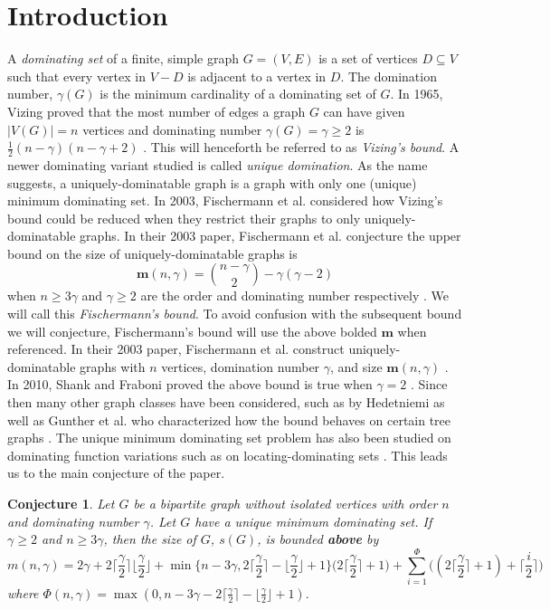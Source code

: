 \documentclass[12pt]{amsart}
\newtheorem{con}[thm]{Conjecture}
\begin{document}
\section{Introduction}
A \textit{dominating set} of a finite, simple graph $G = (V,E)$ is a set of vertices $D \subseteq V$ such that every vertex in $V-D$ is adjacent to a vertex in $D$. The domination number, $\gamma(G)$ is the minimum cardinality of a dominating set of $G$. In 1965, Vizing proved that the most number of edges a graph $G$ can have given $|V(G)| = n$ vertices and dominating number $\gamma(G) = \gamma \geq 2$ is $\frac{1}{2}(n-\gamma)(n-\gamma+2)$ \cite{Vizing}. This will henceforth be referred to as \textit{Vizing's bound}. A newer dominating variant studied is called \textit{unique domination}. As the name suggests, a uniquely-dominatable graph is a graph with only one (unique) minimum dominating set. In 2003, Fischermann et al. considered how Vizing's bound could be reduced when they restrict their graphs to only uniquely-dominatable graphs. In their 2003 paper, Fischermann et al. conjecture the upper bound on the size of uniquely-dominatable graphs is
$$\mathbf{m}(n,\gamma) = {{n-\gamma}\choose{2}} - \gamma(\gamma-2)$$ when $n \geq 3\gamma$ and $\gamma \geq 2$ are the order and dominating number respectively \cite{Original_Paper}. We will call this \textit{Fischermann's bound}. To avoid confusion with the subsequent bound we will conjecture, Fischermann's bound will use the above bolded $\mathbf{m}$ when referenced. In their 2003 paper, Fischermann et al. construct uniquely-dominatable graphs with $n$ vertices, domination number $\gamma$, and size $\mathbf{m}(n,\gamma)$ \cite{Original_Paper}. In 2010, Shank and Fraboni proved the above bound is true when $\gamma = 2$ \cite{Shank_paper}. Since then many other graph classes have been considered, such as by Hedetniemi as well as Gunther et al. who characterized how the bound behaves on certain tree graphs \cite{Hedetniemi_Paper} \cite{Gunther}. The unique minimum dominating set problem has also been studied on dominating function variations such as on locating-dominating sets \cite{L-D_Paper}. This leads us to the main conjecture of the paper.
\begin{con}\label{conj:MAINEDGE}
    Let $G$ be a bipartite graph without isolated vertices with order $n$ and dominating number $\gamma$. Let $G$ have a unique minimum dominating set. If $\gamma \geq 2$ and $n\geq 3\gamma$, then the size of $G$, $s(G)$, is bounded \textbf{above} by $$m(n,\gamma) = 2 \gamma + 2 \Big\lceil \frac{\gamma}{2} \Big\rceil \Big\lfloor \frac{\gamma}{2} \Big\rfloor + \min\Big\{n-3\gamma, 2 \Big\lceil \frac{\gamma}{2} \Big\rceil - \Big\lfloor \frac{\gamma}{2}\Big\rfloor+ 1\Big\}\Big(2\Big\lceil\frac{\gamma}{2}\Big\rceil + 1\Big) + \sum_{i=1}^\Phi \Big((2\Big\lceil\frac{\gamma}{2}\Big\rceil+1) + \Big\lceil\frac{i}{2}\Big\rceil\Big)$$
where $\Phi(n,\gamma) = \max(0, n-3\gamma - 2\lceil\frac{\gamma}{2}\rceil - \lfloor\frac{\gamma}{2}\rfloor + 1).$
\end{con}
\end{document}
